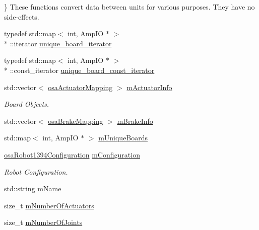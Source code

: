 \} These functions convert data between units for various purposes. They have no side-\/effects. \begin{DoxyCompactItemize}
\item 
typedef std\-::map$<$ int, Amp\-I\-O $\ast$ $>$\\*
\-::iterator \hyperlink{classsaw_robot_i_o1394_1_1osa_robot1394_a978238551892ef80ceb59dfdaca46d9d}{unique\-\_\-board\-\_\-iterator}
\item 
typedef std\-::map$<$ int, Amp\-I\-O $\ast$ $>$\\*
\-::const\-\_\-iterator \hyperlink{classsaw_robot_i_o1394_1_1osa_robot1394_a01f7b23037caa05ef8fceb96d032d451}{unique\-\_\-board\-\_\-const\-\_\-iterator}
\item 
std\-::vector$<$ \hyperlink{structsaw_robot_i_o1394_1_1osa_actuator_mapping}{osa\-Actuator\-Mapping} $>$ \hyperlink{classsaw_robot_i_o1394_1_1osa_robot1394_a8e50f36a5543dc7106a8500c45fef92e}{m\-Actuator\-Info}
\begin{DoxyCompactList}\small\item\em Board Objects. \end{DoxyCompactList}\item 
std\-::vector$<$ \hyperlink{structsaw_robot_i_o1394_1_1osa_brake_mapping}{osa\-Brake\-Mapping} $>$ \hyperlink{classsaw_robot_i_o1394_1_1osa_robot1394_a24d42b0a3f64f3d123ecb7885bc75b3f}{m\-Brake\-Info}
\item 
std\-::map$<$ int, Amp\-I\-O $\ast$ $>$ \hyperlink{classsaw_robot_i_o1394_1_1osa_robot1394_a70a3fca1526a53bdad88bc037ad70e42}{m\-Unique\-Boards}
\item 
\hyperlink{structsaw_robot_i_o1394_1_1osa_robot1394_configuration}{osa\-Robot1394\-Configuration} \hyperlink{classsaw_robot_i_o1394_1_1osa_robot1394_a9db1624d163768f058e4d883147be328}{m\-Configuration}
\begin{DoxyCompactList}\small\item\em Robot Configuration. \end{DoxyCompactList}\item 
std\-::string \hyperlink{classsaw_robot_i_o1394_1_1osa_robot1394_a58671c0e58211874a910b94d5e818366}{m\-Name}
\item 
size\-\_\-t \hyperlink{classsaw_robot_i_o1394_1_1osa_robot1394_a423086327762984870f709c81eccb17a}{m\-Number\-Of\-Actuators}
\item 
size\-\_\-t \hyperlink{classsaw_robot_i_o1394_1_1osa_robot1394_acc4d11ad6a18d9a9b294371cfce7420a}{m\-Number\-Of\-Joints}
\item 

\end{DoxyCompactItemize}
